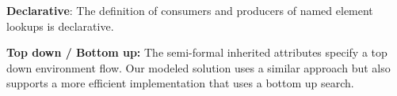 \documentclass{llncs}
\begin{document}

     
     
         

\textbf{Declarative}: The definition of consumers and producers of named element lookups is declarative.

\textbf{Top down / Bottom up:} The semi-formal inherited attributes specify a top down environment flow. Our modeled solution uses a similar approach but also supports a more efficient implementation that uses a bottom up search.

\end{document}
